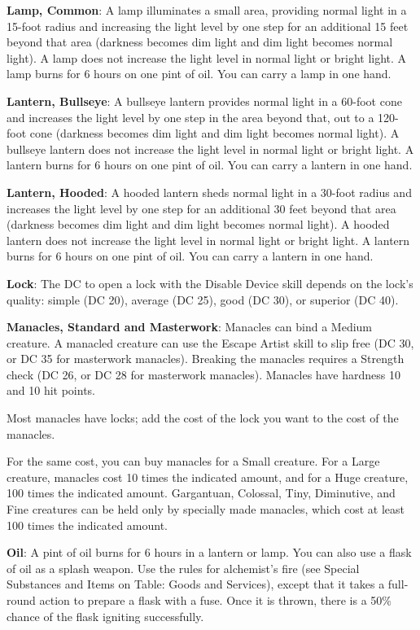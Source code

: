 \textbf{Lamp, Common}: A lamp illuminates a small area, providing normal light in a 15-foot radius and increasing the light level by one step for an additional 15 feet beyond that area (darkness becomes dim light and dim light becomes normal light). A lamp does not increase the light level in normal light or bright light. A lamp burns for 6 hours on one pint of oil. You can carry a lamp in one hand.
		
\textbf{ Lantern, Bullseye}: A bullseye lantern provides normal light in a 60-foot cone and increases the light level by one step in the area beyond that, out to a 120-foot cone (darkness becomes dim light and dim light becomes normal light). A bullseye lantern does not increase the light level in normal light or bright light. A lantern burns for 6 hours on one pint of oil. You can carry a lantern in one hand.
		
\textbf{Lantern, Hooded}: A hooded lantern sheds normal light in a 30-foot radius and increases the light level by one step for an additional 30 feet beyond that area (darkness becomes dim light and dim light becomes normal light). A hooded lantern does not increase the light level in normal light or bright light. A lantern burns for 6 hours on one pint of oil. You can carry a lantern in one hand.
		
\textbf{Lock}: The DC to open a lock with the Disable Device skill depends on the lock's quality: simple (DC 20), average (DC 25), good (DC 30), or superior (DC 40).
		
\textbf{Manacles, Standard and Masterwork}: Manacles can bind a Medium creature. A manacled creature can use the Escape Artist skill to slip free (DC 30, or DC 35 for masterwork manacles). Breaking the manacles requires a Strength check (DC 26, or DC 28 for masterwork manacles). Manacles have hardness 10 and 10 hit points.
		
Most manacles have locks; add the cost of the lock you want to the cost of the manacles.
		
For the same cost, you can buy manacles for a Small creature. For a Large creature, manacles cost 10 times the indicated amount, and for a Huge creature, 100 times the indicated amount. Gargantuan, Colossal, Tiny, Diminutive, and Fine creatures can be held only by specially made manacles, which cost at least 100 times the indicated amount.
		
\textbf{Oil}: A pint of oil burns for 6 hours in a lantern or lamp. You can also use a flask of oil as a splash weapon. Use the rules for alchemist's fire (see Special Substances and Items on Table: Goods and Services), except that it takes a full-round action to prepare a flask with a fuse. Once it is thrown, there is a 50\% chance of the flask igniting successfully.
		
